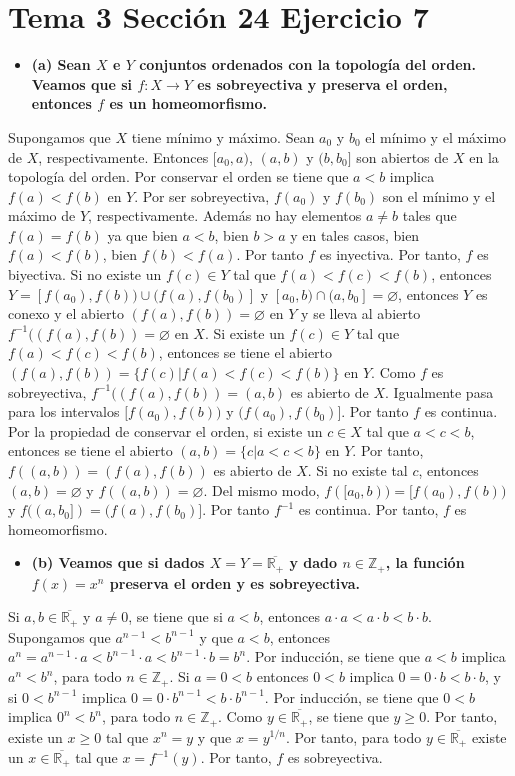 \documentclass{article}
\begin{document}
\section{Tema 3 Sección 24 Ejercicio 7}
\begin{itemize}
\item \bf (a) \rm Sean $X$ e $Y$ conjuntos ordenados con la topología del orden. Veamos que si $f:X\rightarrow Y$ es sobreyectiva y preserva el orden, entonces $f$ es un homeomorfismo.
\end{itemize}
Supongamos que $X$ tiene mínimo y máximo. Sean $a_0$ y $b_0$ el mínimo y el máximo de $X$, respectivamente. Entonces $[a_0, a)$, $(a,b)$ y $(b,b_0]$ son abiertos de $X$ en la topología del orden. Por conservar el orden se tiene que $a<b$ implica $f(a)<f(b)$ en $Y$. Por ser sobreyectiva, $f(a_0)$ y $f(b_0)$  son el mínimo y el máximo de $Y$, respectivamente. Además no hay elementos $a\neq b$ tales que $f(a)=f(b)$ ya que bien $a<b$, bien $b>a$ y en tales casos, bien  $f(a)<f(b)$, bien $f(b)<f(a)$. Por tanto $f$ es inyectiva. Por tanto, $f$ es biyectiva. Si no existe un $f(c)\in Y$ tal que $f(a)<f(c)<f(b)$, entonces $Y=[f(a_0),f(b))\cup (f(a),f(b_0)]$ y $[a_0,b)\cap (a,b_0]=\varnothing$, entonces $Y$ es conexo y el abierto $(f(a),f(b))=\varnothing$ en $Y$ y se lleva al abierto $f^{-1}((f(a),f(b))=\varnothing$ en $X$. Si existe un $f(c)\in Y$ tal que $f(a)<f(c)<f(b)$, entonces se tiene el abierto $(f(a),f(b))=\{f(c)| f(a)<f(c)<f(b)\}$ en $Y$. Como $f$ es sobreyectiva, $f^{-1}((f(a),f(b))=(a,b)$ es abierto de $X$. Igualmente pasa para los intervalos $[f(a_0),f(b))$ y $(f(a_0),f(b_0)]$. Por tanto $f$ es continua. Por la propiedad de conservar el orden, si existe un $c\in X$ tal que $a<c<b$, entonces se tiene el abierto $(a,b)=\{c| a<c<b\}$ en $Y$. Por tanto, $f((a,b))=(f(a),f(b))$ es abierto de $X$. Si no existe tal $c$, entonces $(a,b)=\varnothing$ y $f((a,b))=\varnothing$. Del mismo modo, $f([a_0,b))=[f(a_0),f(b))$ y $f((a,b_0])=(f(a),f(b_0)]$. Por tanto $f^{-1}$ es continua. Por tanto, $f$ es homeomorfismo.
\begin{itemize}
\item \bf (b) \rm Veamos que si dados $X=Y=\overline{\mathbb{R}_+}$ y dado $n\in \mathbb{Z}_+$, la función $f(x)=x^n$ preserva el orden y es sobreyectiva.
\end{itemize}
Si $a,b \in \overline{\mathbb{R}_+}$ y $a\neq 0$, se tiene que si $a<b$, entonces $a\cdot a < a \cdot b < b\cdot b$. Supongamos que $a^{n-1}<b^{n-1}$ y que $a<b$, entonces $a^n= a^{n-1}\cdot a < b^{n-1} \cdot a < b^{n-1}\cdot b=b^n$. Por inducción, se tiene que $a<b$ implica $a^n<b^n$, para todo $n\in \mathbb{Z}_+$. Si $a=0<b$ entonces $ 0<b$ implica $0=0\cdot b< b\cdot b$, y si $ 0<b^{n-1}$ implica $0=0\cdot b^{n-1} < b\cdot b^{n-1}$. Por inducción, se tiene que $0<b$ implica $0^n<b^n$, para todo $n\in \mathbb{Z}_+$. Como $y\in\overline{\mathbb{R}_+}$, se tiene que $y\geq 0$. Por tanto, existe un $x\geq 0$ tal que $x^n=y$ y que $x= y^{1/n}$. Por tanto, para todo $y\in\overline{\mathbb{R}_+}$ existe un $x\in\overline{\mathbb{R}_+}$ tal que $x=f^{-1}(y)$. Por tanto, $f$ es sobreyectiva.
\end{document}
